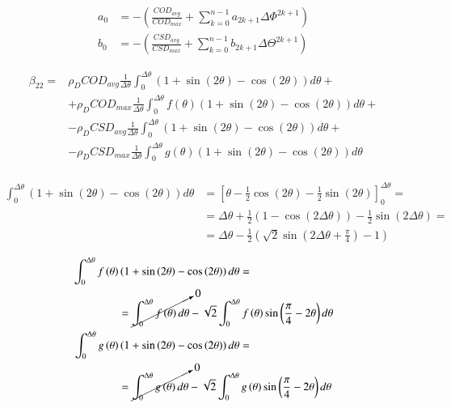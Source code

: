 \documentclass[review]{elsarticle}
\begin{document}
\begin{equation}
\begin{aligned}
a_{0}&=-\left(\frac{COD_{avg}}{COD_{max}}+\sum_{k=0}^{n-1}a_{2k+1}\Delta\Phi^{2k+1}\right)\\
b_{0}&=-\left(\frac{CSD_{avg}}{CSD_{max}}+\sum_{k=0}^{n-1}b_{2k+1}\Delta\Theta^{2k+1}\right)
\end{aligned}
\end{equation}

\begin{equation}
\begin{aligned}
\beta_{22}=&\rho_{D}COD_{avg}\frac{1}{\Delta\theta}\int_{0}^{\Delta\theta}\left(1+\sin\left(2\theta\right)-\cos\left(2\theta\right)\right)d\theta+\\
&+\rho_{D}COD_{max}\frac{1}{\Delta\theta}\int_{0}^{\Delta\theta}f\left(\theta\right)\left(1+\sin\left(2\theta\right)-\cos\left(2\theta\right)\right)d\theta+\\
&-\rho_{D}CSD_{avg}\frac{1}{\Delta\theta}\int_{0}^{\Delta\theta}\left(1+\sin\left(2\theta\right)-\cos\left(2\theta\right)\right)d\theta+\\
&-\rho_{D}CSD_{max}\frac{1}{\Delta\theta}\int_{0}^{\Delta\theta}g\left(\theta\right)\left(1+\sin\left(2\theta\right)-\cos\left(2\theta\right)\right)d\theta\\
\end{aligned}
\end{equation}

\begin{equation}
\begin{aligned}
\int_{0}^{\Delta\theta}\left(1+\sin\left(2\theta\right)-\cos\left(2\theta\right)\right)d\theta&=\left[\theta-\frac{1}{2}\cos\left(2\theta\right)-\frac{1}{2}\sin\left(2\theta\right)\right]_{0}^{\Delta\theta}=\\
&=\Delta\theta+\frac{1}{2}\left(1-\cos\left(2\Delta\theta\right)\right)-\frac{1}{2}\sin\left(2\Delta\theta\right)=\\
&=\Delta\theta-\frac{1}{2}\left(\sqrt{2}\sin\left(2\Delta\theta+\frac{\pi}{4}\right)-1\right)
\end{aligned}
\end{equation}

\begin{equation}
\begin{aligned}
\int_{0}^{\Delta\theta}f\left(\theta\right)&\left(1+\sin\left(2\theta\right)-\cos\left(2\theta\right)\right)d\theta=\\&=\cancelto{0}{\int_{0}^{\Delta\theta}f\left(\theta\right)d\theta}-\sqrt{2}\int_{0}^{\Delta\theta}f\left(\theta\right)\sin\left(\frac{\pi}{4}-2\theta\right)d\theta\\
\int_{0}^{\Delta\theta}g\left(\theta\right)&\left(1+\sin\left(2\theta\right)-\cos\left(2\theta\right)\right)d\theta=\\&=\cancelto{0}{\int_{0}^{\Delta\theta}g\left(\theta\right)d\theta}-\sqrt{2}\int_{0}^{\Delta\theta}g\left(\theta\right)\sin\left(\frac{\pi}{4}-2\theta\right)d\theta\\
\end{aligned}
\end{equation}
\end{document}
